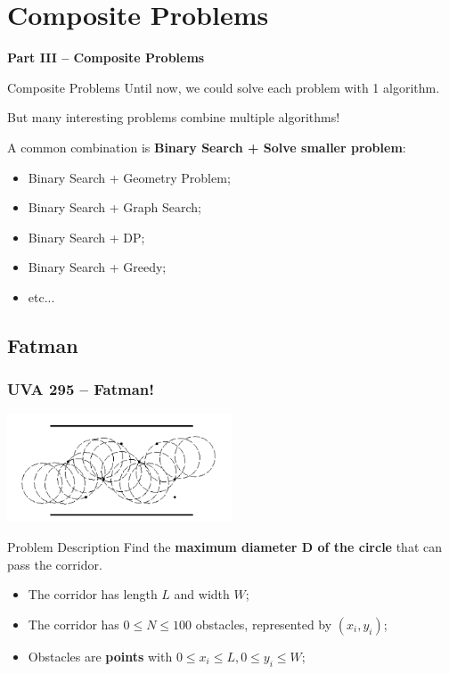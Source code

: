 \section{Composite Problems}
\begin{frame}{}
  \begin{center}
    {\bf Part III -- Composite Problems}
  \end{center}
\end{frame}

\begin{frame}[t]{Composite Problems}
  Until now, we could solve each problem with 1 algorithm.\bigskip

  But many interesting problems combine multiple algorithms!\bigskip

  A common combination is {\bf Binary Search + Solve smaller problem}:
  \begin{itemize}
    \item Binary Search + Geometry Problem;
    \item Binary Search + Graph Search;
    \item Binary Search + DP;
    \item Binary Search + Greedy;
    \item etc...
  \end{itemize}
\end{frame}

\subsection{Fatman}
\begin{frame}
  \frametitle{UVA 295 -- Fatman!}
  \begin{center}
    \includegraphics[width=0.5\textwidth]{img/fatman}
  \end{center}

  {\smaller
    \begin{block}{Problem Description}
      Find the {\bf maximum diameter D of the circle} that can pass the corridor.
      \begin{itemize}
      \item The corridor has length $L$ and width $W$;
      \item The corridor has $0 \leq N \leq 100$ obstacles, represented by $(x_i,y_i)$;
      \item Obstacles are {\bf points} with $0 \leq x_i \leq L, 0\leq y_i \leq W$;
      \end{itemize}
    \end{block}
  }
\end{frame}

